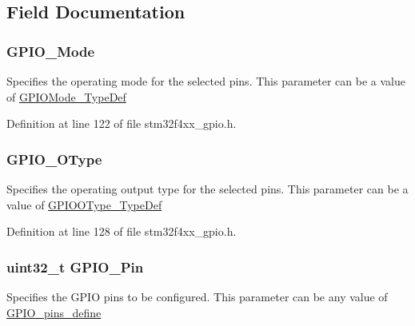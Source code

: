 \subsection{Field Documentation}
\hypertarget{struct_g_p_i_o___init_type_def_a0c7e8901d8b511bbb8c3b153f705dbba}{
\subsubsection[{G\-P\-I\-O\-\_\-\-Mode}]{ G\-P\-I\-O\-\_\-\-Mode}}\label{struct_g_p_i_o___init_type_def_a0c7e8901d8b511bbb8c3b153f705dbba}
Specifies the operating mode for the selected pins. This parameter can be a value of \hyperlink{group___g_p_i_o_ga1347339e1c84a196fabbb31205eec5d4}{G\-P\-I\-O\-Mode\-\_\-\-Type\-Def} 

Definition at line 122 of file stm32f4xx\-\_\-gpio.\-h.

\hypertarget{struct_g_p_i_o___init_type_def_a321a268abbed3d2f01c27383e8daf92d}{
\subsubsection[{G\-P\-I\-O\-\_\-\-O\-Type}]{ G\-P\-I\-O\-\_\-\-O\-Type}}\label{struct_g_p_i_o___init_type_def_a321a268abbed3d2f01c27383e8daf92d}
Specifies the operating output type for the selected pins. This parameter can be a value of \hyperlink{group___g_p_i_o_gae74212e8d66c389f47326b06bdf6d2ab}{G\-P\-I\-O\-O\-Type\-\_\-\-Type\-Def} 

Definition at line 128 of file stm32f4xx\-\_\-gpio.\-h.

\hypertarget{struct_g_p_i_o___init_type_def_a15699fc7e215ac2579cd24ca76cd4591}{
\subsubsection[{G\-P\-I\-O\-\_\-\-Pin}]{\setlength{\rightskip}{0pt plus 5cm}uint32\-\_\-t G\-P\-I\-O\-\_\-\-Pin}}\label{struct_g_p_i_o___init_type_def_a15699fc7e215ac2579cd24ca76cd4591}
Specifies the G\-P\-I\-O pins to be configured. This parameter can be any value of \hyperlink{group___g_p_i_o__pins__define}{G\-P\-I\-O\-\_\-pins\-\_\-define} 

